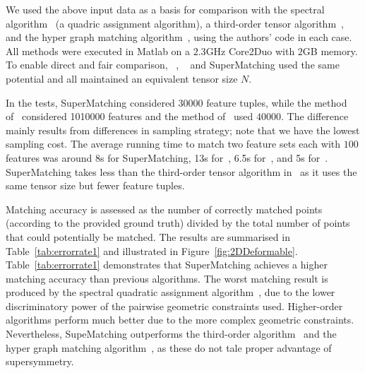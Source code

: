 We used the above input data as a basis for comparison with the spectral algorithm~\cite{Cour06} (a quadric assignment algorithm),
a third-order tensor algorithm~\cite{Duchenne09},
and the hyper graph matching algorithm~\cite{Zass08}, using the authors' code in each case.
All methods were executed in Matlab on a $2.3$GHz Core2Duo with $2$GB memory.
To enable direct and fair comparison,
~\cite{Duchenne09}, ~\cite{Zass08} and SuperMatching
used the same potential and
all maintained an equivalent tensor size $N$.

In the tests, SuperMatching considered $30000$ feature tuples, while the method of~\cite{Duchenne09} considered 1010000 features  and the method of~\cite{Zass08} used $40000$.
The difference  mainly results from differences in sampling strategy; note that we have the lowest  sampling cost.
The average running time to match two feature sets each with $100$ features was around 8s for SuperMatching, 13s for~\cite{Duchenne09}, 6.5s for~\cite{Zass08}, and 5s for~\cite{Cour06}.
SuperMatching takes less  than the third-order tensor algorithm in~\cite{Duchenne09} as it uses the same tensor size but fewer feature tuples.

Matching accuracy is assessed as the number of correctly matched points (according to the provided ground truth) divided by the total number of points that could potentially be matched.
The results are summarised in Table~\ref{tab:errorrate1} and illustrated in Figure~\ref{fig:2DDeformable}.
Table~\ref{tab:errorrate1} demonstrates that SuperMatching achieves a higher matching accuracy than previous algorithms.
The worst matching result is produced by the spectral quadratic assignment algorithm~\cite{Cour06},
due to the lower discriminatory power of the pairwise geometric constraints used.
Higher-order algorithms perform much better due to the more complex geometric constraints.
Nevertheless, SupeMatching outperforms the third-order algorithm~\cite{Duchenne09} and the hyper graph matching algorithm~\cite{Zass08}, as these do not tale proper advantage of supersymmetry.


